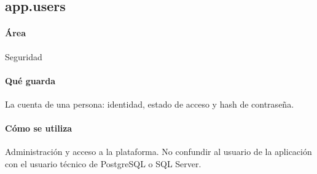 \subsection{app.users}
\paragraph{Área} Seguridad

\paragraph{Qué guarda} La cuenta de una persona: identidad, estado de acceso y hash de contraseña.

\paragraph{Cómo se utiliza} Administración y acceso a la plataforma. No confundir al usuario de la aplicación con el usuario técnico de PostgreSQL o SQL Server.

